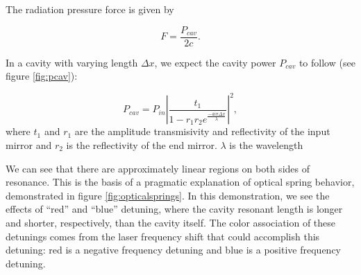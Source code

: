 The radiation pressure force is given by 

\begin{equation}
F=\frac{P_{cav}}{2c}.
\label{eq:radpress}
\end{equation}

In a cavity with varying length $\Delta x$, we expect the cavity power $P_{cav}$ to follow \cite{siegman} (see figure \ref{fig:pcav}):

\begin{equation}
P_{cav} = P_{in} \left| \frac{t_1}{1-r_1 r_2e^\frac{-4i\pi\Delta x}{\lambda}}\right| ^2,
\label{eq:pcav}
\end{equation}
where $t_1$ and $r_1$ are the amplitude transmisivity and reflectivity of the input mirror and $r_2$ is the reflectivity of the end mirror. $\lambda$ is the wavelength 

We can see that there are approximately linear regions on both sides of resonance. 
This is the basis of a pragmatic explanation of optical spring behavior, demonstrated in figure \ref{fig:opticalsprings}.
In this demonstration, we see the effects of ``red'' and ``blue'' detuning, where the cavity resonant length is longer and shorter, respectively, than the cavity itself. 
The color association of these detunings comes from the laser frequency shift that could accomplish this detuning: red is a negative frequency detuning and blue is a positive frequency detuning. 


